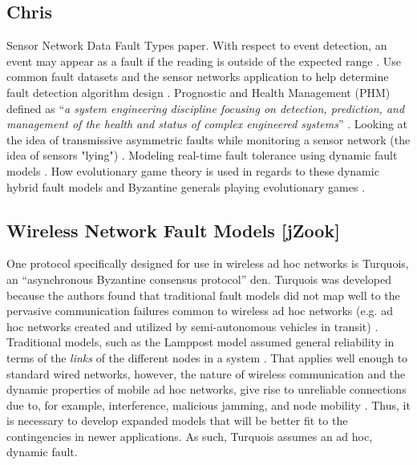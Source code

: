 \documentclass[twoside, conference]{IEEEtran}
\begin{document}
\subsection{Chris}
Sensor Network Data Fault Types paper\cite{Ni2009}.  With respect to event detection, an event may appear as a fault if the reading is outside of the expected range \cite[p. 25:5]{Ni2009}.  Use common fault datasets and the sensor networks application to help determine fault detection algorithm design \cite[p. 25:7]{Ni2009}.  Prognostic and Health Management (PHM) defined as ``\textit{a system engineering discipline focusing on detection, prediction, and management of the health and status of complex engineered systems}'' \cite[p. 1]{Ma2009}.  Looking at the idea of transmissive asymmetric faults while monitoring a sensor network (the idea of sensors "lying") \cite[p. 4]{Ma2009}.  Modeling real-time fault tolerance using dynamic fault models \cite[p. 4]{Ma2009}\cite{Ma2008}.  How evolutionary game theory is used in regards to these dynamic hybrid fault models \cite[p. 6]{Ma2009} and Byzantine generals playing evolutionary games \cite[p. 11,15]{Ma2009}.


\subsection{Wireless Network Fault Models [jZook]}


One protocol specifically designed for use in wireless ad hoc networks is Turquois, an ``asynchronous Byzantine consensus protocol'' \cite{Moniz2013}{den}. Turquois was developed because the authors found that traditional fault models did not map well to the pervasive communication failures common to wireless ad hoc networks (e.g. ad hoc networks created and utilized by semi-autonomous vehicles in transit) \cite{Moniz2013}. Traditional models, such as the Lamppost model assumed general reliability in terms of the \textit{links} of the different nodes in a system \cite{Moniz2013}. That applies well enough to standard wired networks, however, the nature of wireless communication and the dynamic properties of mobile ad hoc networks, give rise to unreliable connections due to, for example, interference, malicious jamming, and node mobility \cite{Moniz2013}. Thus, it is necessary to develop expanded models that will be better fit to the contingencies in newer applications. As such, Turquois assumes an ad hoc, dynamic fault\cite{Moniz2013}.
\end{document}
